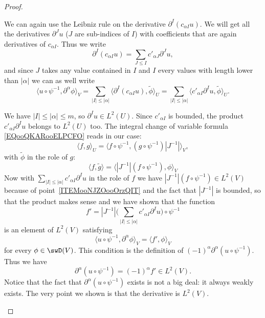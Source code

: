\begin{proof}
\begin{subproof}
		We can again use the Leibniz rule on the derivative \( \partial^{I}(c_{\alpha I} u)\). We will get all the derivatives \( \partial^Ju\) (\( J\) are sub-indices of \( I\)) with coefficients that are again derivatives of \( c_{\alpha I}\). Thus we write
		\begin{equation}
			\partial^I(c_{\alpha I}u)=\sum_{J\leq I}c'_{\alpha J}\partial^Ju,
		\end{equation}
		and since \( J\) takes any value contained in \( I\) and \( I\) every values with length lower than \( | \alpha |\) we can as well write
		\begin{equation}
			\langle u\circ\psi^{-1}, \partial^{\alpha}\phi\rangle_V =  \sum_{| I |\leq | \alpha |}\langle \partial^{I}(c_{\alpha I}u), \tilde \phi\rangle_U =\sum_{| I |\leq | \alpha |}\langle c'_{\alpha I}\partial^Iu, \tilde \phi\rangle_U.
		\end{equation}

		We have \( | I |\leq | \alpha |\leq m\), so \( \partial^Iu\in L^2(U)\). Since \( c'_{\alpha I}\) is bounded, the product \( c'_{\alpha I}\partial^Iu\) belongs to \( L^2(U)\) too. The integral change of variable formula \eqref{EQooQKARooELPCFO} reads in our case:
		\begin{equation}
			\langle f, g\rangle_U=\langle f\circ \psi^{-1}, (g\circ\psi^{-1})| J^{-1} |\rangle_V,
		\end{equation}
		with \( \tilde \phi\) in the role of \( g\):
		\begin{equation}
			\langle f, \tilde g\rangle =\langle | J^{-1} |(f\circ\psi^{-1}), \phi\rangle_V
		\end{equation}
		Now with \( \sum_{| I |\leq | \alpha |}c'_{\alpha I}\partial^Iu\) in the role of \( f\) we have \( | J^{-1} |(f\circ\psi^{-1})\in L^2(V)\) because of point~\ref{ITEMooNJZOooOrzQIT} and the fact that \( | J^{-1} |\) is bounded, so that the product makes sense and we have shown that the function
		\begin{equation}
			f'=| J^{-1} |\big( \sum_{| I |\leq | \alpha |}c'_{\alpha I}\partial^Iu \big)\circ\psi^{-1}
		\end{equation}
		is an element of \( L^2(V)\) satisfying
		\begin{equation}
			\langle u\circ\psi^{-1}, \partial^{\alpha}\phi\rangle_V =   \langle f', \phi\rangle_V
		\end{equation}
		for every \( \phi\in\swD(V)\). This condition is the definition of \(   (-1)^{\alpha} \partial^{\alpha}(u\circ\psi^{-1})\). Thus we have
		\begin{equation}
			\partial^{\alpha}(u\circ\psi^{-1})=(-1)^{\alpha}f'\in L^2(V).
		\end{equation}
		Notice that the fact that \( \partial^{\alpha}(u\circ\psi^{-1})\) exists is not a big deal: it always weakly exists. The very point we shown is that the derivative is \( L^2(V)\).


\end{subproof}
\end{proof}
